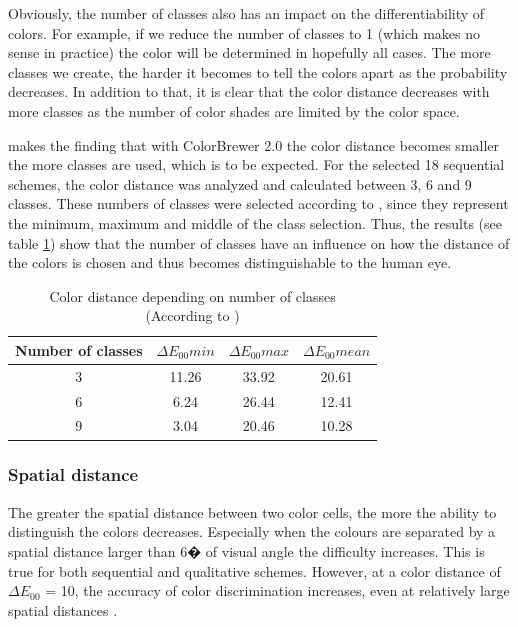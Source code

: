 Obviously, the number of classes also has an impact on the differentiability of colors. For example, if we reduce the number of classes to 1 (which makes no sense in practice) the color will be determined in hopefully all cases. The more classes we create, the harder it becomes to tell the colors apart as the probability decreases. In addition to that, it is clear that the color distance decreases with more classes as the number of color shades are limited by the color space. 

\textcite{brychtovaC2017} makes the finding that with ColorBrewer 2.0 the color distance becomes smaller the more classes are used, which is to be expected. For the selected 18 sequential schemes, the color distance was analyzed and calculated between 3, 6 and 9 classes. These numbers of classes were selected according to \textcite{brychtovaC2017}, since they represent the minimum, maximum and middle of the class selection. Thus, the results (see table \ref{tab:classes}) show that the number of classes have an influence on how the distance of the colors is chosen and thus becomes distinguishable to the human eye. 

\begin{table}[h!]
\centering
\caption[Color distance depending on number of classes]{Color distance depending on number of classes \\ (According to \textcite{brychtovaC2017})}
	\begin{tabular}{c c c c }
		\hline
		\hline
		Number of classes & $\Delta E_{00}min$ & $\Delta E_{00}max$ & $\Delta E_{00}mean$ \\ 
		\hline
		\hline
		3 & 11.26 & 33.92 & 20.61 \\  
		6 & 6.24 & 26.44 & 12.41 \\
		9 & 3.04 & 20.46 & 10.28   
	\end{tabular}
\label{tab:classes}
\end{table}

\subsubsection{Spatial distance}
The greater the spatial distance between two color cells, the more the ability to distinguish the colors decreases. Especially when the colours are separated by a spatial distance larger than 6�  of visual  angle the difficulty increases. This is true for both sequential and qualitative schemes. However, at a color distance of $\Delta E_{00}$ = 10, the accuracy of color discrimination increases, even at relatively large spatial distances \parencite{article}. 

